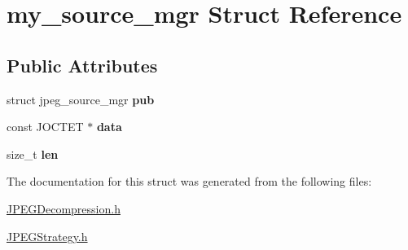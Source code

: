 \hypertarget{structmy__source__mgr}{\section{my\+\_\+source\+\_\+mgr Struct Reference}
\label{structmy__source__mgr}
}
\subsection*{Public Attributes}
\begin{DoxyCompactItemize}
\item 
\hypertarget{structmy__source__mgr_a8572f33f87bec948592001edea12680f}{struct jpeg\+\_\+source\+\_\+mgr {\bfseries pub}}\label{structmy__source__mgr_a8572f33f87bec948592001edea12680f}

\item 
\hypertarget{structmy__source__mgr_ad9a24935cf19bd9dc1ace874a11e886d}{const J\+O\+C\+T\+E\+T $\ast$ {\bfseries data}}\label{structmy__source__mgr_ad9a24935cf19bd9dc1ace874a11e886d}

\item 
\hypertarget{structmy__source__mgr_ad6ba4e08165f32e64469f754d4671bd9}{size\+\_\+t {\bfseries len}}\label{structmy__source__mgr_ad6ba4e08165f32e64469f754d4671bd9}

\end{DoxyCompactItemize}


The documentation for this struct was generated from the following files\+:\begin{DoxyCompactItemize}
\item 
\hyperlink{_j_p_e_g_decompression_8h}{J\+P\+E\+G\+Decompression.\+h}\item 
\hyperlink{_j_p_e_g_strategy_8h}{J\+P\+E\+G\+Strategy.\+h}\end{DoxyCompactItemize}
